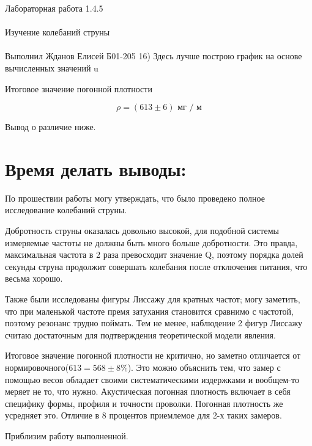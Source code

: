 \documentclass{astroedu-lab}
\begin{document}
\begin{problem}{\huge Лабораторная работа 1.4.5\\\\Изучение колебаний струны\\\\Выполнил Жданов Елисей Б01-205}
16) Здесь лучше построю график на основе вычисленных значений u

\begin{center}
\end{center}

Итоговое значение погонной плотности

\begin{equation}
	\rho = (613 \pm 6) \text{ мг / м}
\end{equation}

Вывод о различие ниже.

\section{Время делать выводы:}

По прошествии работы могу утверждать, что было проведено полное исследование колебаний струны.

Добротность струны оказалась довольно высокой, для подобной системы измеряемые частоты не должны быть много больше добротности. Это правда, максимальная частота в 2 раза превосходит значение Q, поэтому порядка долей секунды струна продолжит совершать колебания после отключения питания, что весьма хорошо.

Также были исследованы фигуры Лиссажу для кратных частот; могу заметить, что при маленькой частоте премя затухания становится сравнимо с частотой, поэтому резонанс трудно поймать. Тем не менее, наблюдение 2 фигур Лиссажу считаю достаточным для подтверждения теоретической модели явления.

Итоговое значение погонной плотности не критично, но заметно отличается от нормировочного($613 = 568 \pm 8\%$). Это можно объяснить тем, что замер с помощью весов обладает своими систематическими издержками и вообщем-то меряет не то, что нужно. Акустическая погонная плотность включает в себя специфику формы, профиля и точности проволки. Погонная плотность же усредняет это. Отличие в 8 процентов приемлемое для 2-х таких замеров.

Приблизим работу выполненной.


\end{problem}
\end{document}
